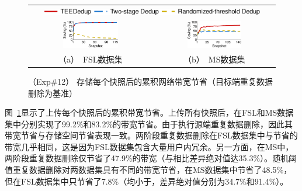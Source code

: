 \begin{figure}[t]
    \centering
    \begin{tabular}{@{\ }c@{\ }c}
    \multicolumn{2}{c}{\includegraphics[width=0.9\textwidth]{pic/sgxdedup/upload_traffic_legend.pdf}} \\
    \hspace{-0.1in}
    \includegraphics[width=0.47\textwidth]{pic/sgxdedup/upload_traffic_fsl.pdf} &
    \includegraphics[width=0.47\textwidth]{pic/sgxdedup/upload_traffic_ms.pdf}\\ 
    \mbox{\small （a） FSL数据集} &
    \mbox{\small （b） MS数据集}
    \end{tabular}
    \caption{（Exp\#12） 存储每个快照后的累积网络带宽节省（目标端重复数据删除为基准）}
    \label{fig:sgxdedup-uploadTraffic}
\end{figure}

图~\ref{fig:sgxdedup-uploadTraffic}显示了上传每个快照后的累积带宽节省。上传所有快照后，\sysnameS 在FSL和MS数据集中分别实现了99.2\%和83.2\%的带宽节省。由于\sysnameS 执行源端重复数据删除，因此其带宽节省与存储空间节省表现一致。两阶段重复数据删除在FSL数据集中与\sysnameS 节省的带宽几乎相同，这是因为FSL数据集包含大量用户内冗余。另一方面，在MS中，两阶段重复数据删除仅节省了47.9\%的带宽（与\sysnameS 相比差异绝对值达35.3\%）。随机阈值重复数据删除对两数据集具有不同的带宽节省，在MS数据集中节省了48.5\%，但在FSL数据集中只节省了7.8\%（均小于\sysnameS，差异绝对值分别为34.7\%和91.4\%）。

